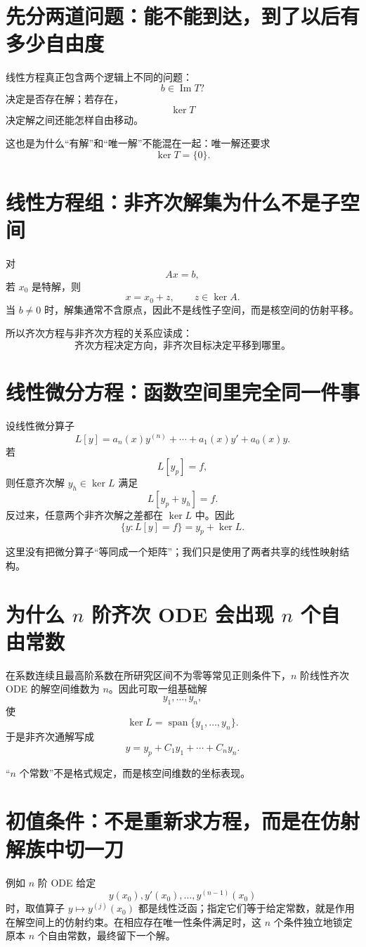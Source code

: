 \documentclass[profile=standard]{ipara-handbook}
\begin{document}
\section{先分两道问题：能不能到达，到了以后有多少自由度}
线性方程真正包含两个逻辑上不同的问题：
\[
\boxed{b\in\operatorname{Im}T?}
\]
决定是否存在解；若存在，
\[
\boxed{\ker T}
\]
决定解之间还能怎样自由移动。

这也是为什么“有解”和“唯一解”不能混在一起：唯一解还要求
\[
\ker T=\{0\}.
\]

\section{线性方程组：非齐次解集为什么不是子空间}
对
\[
Ax=b,
\]
若 $x_0$ 是特解，则
\[
\boxed{x=x_0+z,\qquad z\in\ker A.}
\]
当 $b\neq0$ 时，解集通常不含原点，因此不是线性子空间，而是核空间的仿射平移。

所以齐次方程与非齐次方程的关系应读成：
\[
\boxed{\text{齐次方程决定方向，非齐次目标决定平移到哪里。}}
\]

\section{线性微分方程：函数空间里完全同一件事}
设线性微分算子
\[
L[y]=a_n(x)y^{(n)}+\cdots+a_1(x)y'+a_0(x)y.
\]
若
\[
L[y_p]=f,
\]
则任意齐次解 $y_h\in\ker L$ 满足
\[
L[y_p+y_h]=f.
\]
反过来，任意两个非齐次解之差都在 $\ker L$ 中。因此
\[
\boxed{\{y:L[y]=f\}=y_p+\ker L.}
\]

这里没有把微分算子“等同成一个矩阵”；我们只是使用了两者共享的线性映射结构。

\section{为什么 $n$ 阶齐次 ODE 会出现 $n$ 个自由常数}
在系数连续且最高阶系数在所研究区间不为零等常见正则条件下，$n$ 阶线性齐次 ODE 的解空间维数为 $n$。因此可取一组基础解
\[
y_1,\dots,y_n,
\]
使
\[
\ker L=\operatorname{span}\{y_1,\dots,y_n\}.
\]
于是非齐次通解写成
\[
\boxed{y=y_p+C_1y_1+\cdots+C_ny_n.}
\]

“$n$ 个常数”不是格式规定，而是核空间维数的坐标表现。

\section{初值条件：不是重新求方程，而是在仿射解族中切一刀}
例如 $n$ 阶 ODE 给定
\[
y(x_0),y'(x_0),\dots,y^{(n-1)}(x_0)
\]
时，取值算子 $y\mapsto y^{(j)}(x_0)$ 都是线性泛函；指定它们等于给定常数，就是作用在解空间上的仿射约束。在相应存在唯一性条件满足时，这 $n$ 个条件独立地锁定原本 $n$ 个自由常数，最终留下一个解。
\end{document}

